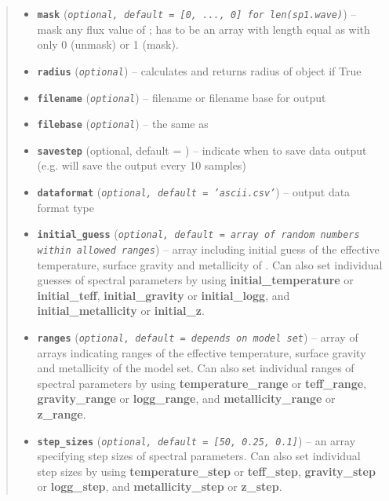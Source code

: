 \documentclass[letterpaper,10pt,english]{sphinxmanual}
\begin{document}
\begin{fulllineitems}
\begin{quote}
\begin{description}
\begin{itemize}
\item {} 
\textbf{\texttt{mask}} (\emph{\texttt{optional, default = {[}0, ..., 0{]} for len(sp1.wave)}}) -- mask any flux value of ; has to be an array with length equal as  with only 0 (unmask) or 1 (mask).

\item {} 
\textbf{\texttt{radius}} (\emph{\texttt{optional}}) -- calculates and returns radius of object if True

\item {} 
\textbf{\texttt{filename}} (\emph{\texttt{optional}}) -- filename or filename base for output

\item {} 
\textbf{\texttt{filebase}} (\emph{\texttt{optional}}) -- the same as 

\item {} 
\textbf{\texttt{savestep}} (optional, default = ) -- indicate when to save data output (e.g.  will save the output every 10 samples)

\item {} 
\textbf{\texttt{dataformat}} (\emph{\texttt{optional, default = 'ascii.csv'}}) -- output data format type

\item {} 
\textbf{\texttt{initial\_guess}} (\emph{\texttt{optional, default = array of random numbers within allowed ranges}}) -- array including initial guess of the effective temperature, surface gravity and metallicity of .
Can also set individual guesses of spectral parameters by using \textbf{initial\_temperature} or \textbf{initial\_teff},
\textbf{initial\_gravity} or \textbf{initial\_logg}, and \textbf{initial\_metallicity} or \textbf{initial\_z}.

\item {} 
\textbf{\texttt{ranges}} (\emph{\texttt{optional, default = depends on model set}}) -- array of arrays indicating ranges of the effective temperature, surface gravity and metallicity of the model set.
Can also set individual ranges of spectral parameters by using \textbf{temperature\_range} or \textbf{teff\_range},
\textbf{gravity\_range} or \textbf{logg\_range}, and \textbf{metallicity\_range} or \textbf{z\_range}.

\item {} 
\textbf{\texttt{step\_sizes}} (\emph{\texttt{optional, default = {[}50, 0.25, 0.1{]}}}) -- an array specifying step sizes of spectral parameters. Can also set individual step sizes by using
\textbf{temperature\_step} or \textbf{teff\_step}, \textbf{gravity\_step} or \textbf{logg\_step}, and \textbf{metallicity\_step} or \textbf{z\_step}.


\end{itemize}
\end{description}
\end{quote}
\end{fulllineitems}
\end{document}
